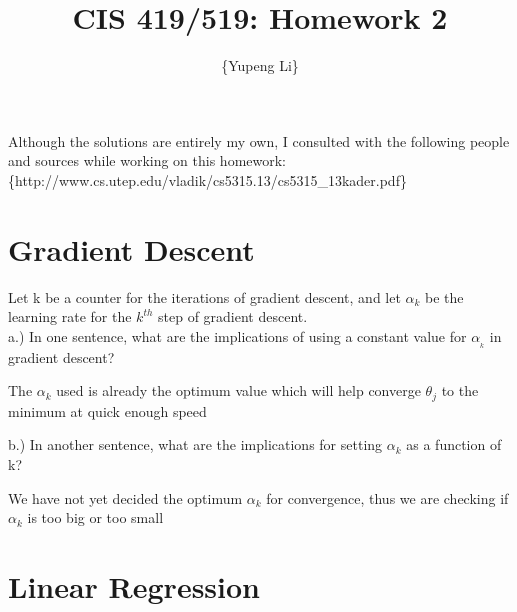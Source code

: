 \documentclass{article}
\title{CIS 419/519: Homework 2}
\author{\{Yupeng Li\}}
\date{}
\begin{document}
    \maketitle
    Although the solutions are entirely my own, I consulted with the following people and sources while working on this homework:
     \{http://www.cs.utep.edu/vladik/cs5315.13/cs5315\_13kader.pdf\}
    
    \section{Gradient Descent}
    
    Let k be a counter for the iterations of gradient descent, and let $\alpha_k$ be the learning rate for the $k^{th}$ step of gradient descent.\\
    
    
a.) In one sentence, what are the implications of using a constant value for $\alpha__{k}$ in gradient descent?


The $\alpha_{k}$ used is already the optimum value which will help converge $\theta_{j}$ to the minimum at quick enough speed 


b.) In another sentence, what are the implications for setting $\alpha_{k}$ as a function of k?

We have not yet decided the optimum $\alpha_k$ for convergence, thus we are checking if $\alpha_k$ is too big or too small



    
    
    \section{Linear Regression}


        
        
\end{document}
